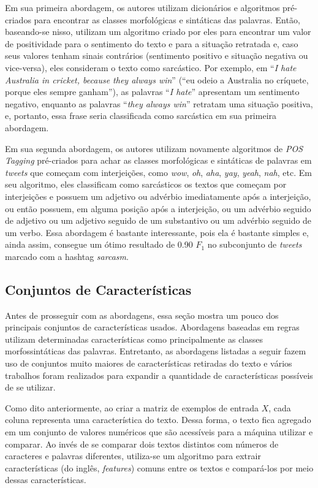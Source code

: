 Em sua primeira abordagem, os autores utilizam dicionários e algoritmos
pré-criados para encontrar as classes morfológicas e sintáticas das palavras.
Então, baseando-se nisso, utilizam um algoritmo criado por eles para
encontrar um valor de positividade para o sentimento do texto e para a situação
retratada e, caso seus valores tenham sinais contrários (sentimento positivo e
situação negativa ou vice-versa), eles consideram o texto como sarcástico. Por
exemplo, em ``\textit{I hate Australia in cricket, because they always win}''
(``eu odeio a Australia no críquete, porque eles sempre ganham''), as palavras
``\textit{I hate}'' apresentam um sentimento negativo, enquanto as palavras
``\textit{they always win}'' retratam uma situação positiva, e, portanto, essa
frase seria classificada como sarcástica em sua primeira abordagem.

Em sua segunda abordagem, os autores utilizam novamente algoritmos de
\textit{POS Tagging} pré-criados para achar as classes morfológicas e sintáticas
de palavras em \textit{tweets} que começam com interjeições, como \textit{wow},
\textit{oh}, \textit{aha}, \textit{yay}, \textit{yeah}, \textit{nah}, etc. Em
seu algoritmo, eles classificam como sarcásticos os textos que começam por
interjeições e possuem um adjetivo ou advérbio imediatamente após a interjeição,
ou então possuem, em alguma posição após a interjeição, ou um advérbio seguido
de adjetivo ou um adjetivo seguido de um substantivo ou um advérbio seguido de
um verbo. Essa abordagem é bastante interessante, pois ela é bastante simples e,
ainda assim, consegue um ótimo resultado de 0.90 $F_1$ no subconjunto de
\textit{tweets} marcado com a hashtag \textit{sarcasm}.

\subsection{Conjuntos de Características}%
\label{sub:conjuntos-de-caracteristicas}

Antes de prosseguir com as abordagens, essa seção mostra um pouco dos
principais conjuntos de características usados. Abordagens
baseadas em regras utilizam determinadas características como principalmente as
classes morfossintáticas das palavras. Entretanto, as abordagens listadas a
seguir fazem uso de conjuntos muito maiores de características retiradas do
texto e vários trabalhos foram realizados para expandir a quantidade de
características possíveis de se utilizar.

Como dito anteriormente, ao criar a matriz de exemplos de entrada $X$, cada
coluna representa uma característica do texto. Dessa forma, o texto fica
agregado em um conjunto de valores numéricos que são acessíveis para a máquina
utilizar e comparar. Ao invés de se comparar dois textos distintos com números
de caracteres e palavras diferentes, utiliza-se um algoritmo para extrair
características (do inglês, \textit{features}) comuns entre os textos e
compará-los por meio dessas características.

